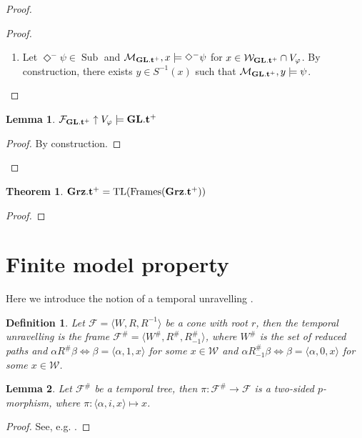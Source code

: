 \documentclass[a4paper]{article}
\theoremstyle{defin}
\newtheorem{defin}{Definition}
\theoremstyle{theorem}
\newtheorem{theorem}{Theorem}
\theoremstyle{prop}
\theoremstyle{lemma}
\newtheorem{lemma}{Lemma}
\theoremstyle{ex}
\theoremstyle{col}
\newcommand{\DiamondM}{\Diamond^{-}}
\begin{document}
\begin{proof}
\begin{proof}
\begin{enumerate}
  \item Let $\DiamondM \psi \in \operatorname{Sub}$ and $\mathcal{M}_{{\bf GL}.{\bf t}^{+}}, x \models \DiamondM \psi$ for
  $x \in \mathcal{W}_{{{\bf GL}.{\bf t}^{+}}} \cap V_{\varphi}$. By construction, there exists $y \in S^{-1}(x)$ such that $\mathcal{M}_{{\bf GL}.{\bf t}^{+}}, y \models \psi$.
\end{enumerate}
\end{proof}

\begin{lemma}
  $\mathcal{F}_{{\bf GL}.{\bf t}^{+}} \uparrow V_{\varphi} \models {\bf GL}.{\bf t}^{+}$
\end{lemma}
\begin{proof}
  By construction.
\end{proof}
\end{proof}

\begin{theorem}
  ${\bf Grz}.{\bf t}^{+} = \operatorname{TL}(\operatorname{Frames}({\bf Grz}.{\bf t}^{+}))$
\end{theorem}

\begin{proof}
\end{proof}

\section{Finite model property}

Here we introduce the notion of a temporal unravelling \cite{Shehtman14}.

\begin{defin}
  Let $\mathcal{F} = \langle W, R, R^{-1} \rangle$ be a cone with root $r$, then the temporal unravelling is the frame
  $\mathcal{F}^{\#} = \langle W^{\#}, R^{\#}, R_{-1}^{\#} \rangle$, where $W^{\#}$ is the set of reduced paths and
  $\alpha R^{\#} \beta \Leftrightarrow \beta = \langle \alpha, 1, x \rangle$ for some $x \in \mathcal{W}$ and
  $\alpha R_{-1}^{\#} \beta \Leftrightarrow \beta = \langle \alpha, 0, x \rangle$ for some $x \in \mathcal{W}$.
\end{defin}

\begin{lemma} Let $\mathcal{F}^{\#}$ be a temporal tree, then $\pi : \mathcal{F}^{\#} \to \mathcal{F}$ is a two-sided $p$-morphism, where
  $\pi : \langle \alpha, i, x \rangle \mapsto x$.
\end{lemma}
\begin{proof}
  See, e.g. \cite{Shehtman14}.
\end{proof}
\end{document}
